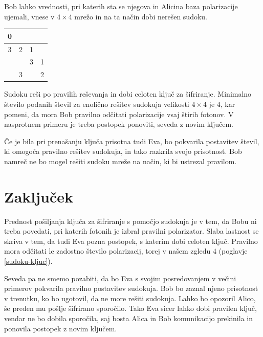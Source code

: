 \documentclass[A4paper, 11pt]{article}
\begin{document}
Bob lahko vrednosti, pri katerih sta se njegova in Alicina baza polarizacije ujemali, vnese v $4\times4$ mrežo in na ta način dobi nerešen sudoku.

\begin{center}
\begin{tabular}{| c | c || c | c |}
\hline
0 & & & \\
\hline
3 & 2 & 1 & \\
\hline
\hline
& & 3 & 1\\
\hline
& 3 & & 2\\
\hline
\end{tabular}
\end{center}

Sudoku reši po pravilih reševanja in dobi celoten ključ za šifriranje. Minimalno število podanih števil za enolično rešitev sudokuja velikosti $4\times4$ je $4$, kar pomeni, da mora Bob pravilno odčitati polarizacije vsaj štirih fotonov. V nasprotnem primeru je treba postopek ponoviti, seveda z novim ključem.

Če je bila pri prenašanju ključa prisotna tudi Eva, bo pokvarila postavitev števil, ki omogoča pravilno rešitev sudokuja, in tako razkrila svojo prisotnost. Bob namreč ne bo mogel rešiti sudoku mreže na način, ki bi ustrezal pravilom.



\section{Zaključek}

Prednost pošiljanja ključa za šifriranje s pomočjo sudokuja je v tem, da Bobu ni treba povedati, pri katerih fotonih je izbral pravilni polarizator. Slaba lastnost se skriva v tem, da tudi Eva pozna postopek, s katerim dobi celoten ključ. Pravilno mora odčitati le zadostno število polarizacij, torej v našem zgledu $4$ (poglavje \ref{sudoku-kljuc}).

Seveda pa ne smemo pozabiti, da bo Eva s svojim posredovanjem v večini primerov pokvarila pravilno postavitev sudokuja. Bob bo zaznal njeno prisotnost v trenutku, ko bo ugotovil, da ne more rešiti sudokuja. Lahko bo opozoril Alico, še preden mu pošlje šifrirano sporočilo. Tako Eva sicer lahko dobi pravilen ključ, vendar ne bo dobila sporočila, saj bosta Alica in Bob komunikacijo prekinila in ponovila postopek z novim ključem. 

\pagebreak

\end{document}
